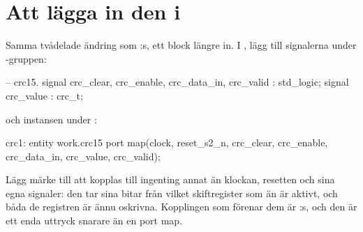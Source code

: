 \section{Att lägga in den i }
\label{c13:sec:wire}

Samma tvådelade ändring som :s, ett block längre in. I
, lägg till signalerna under -gruppen:

\begin{vhdlcode}
    -- crc15.
    signal crc_clear, crc_enable, crc_data_in, crc_valid : std_logic;
    signal crc_value                                     : crc_t;
\end{vhdlcode}

och instansen under :

\begin{vhdlcode}
    crc1: entity work.crc15
        port map(clock, reset_s2_n, crc_clear, crc_enable, crc_data_in, crc_value, crc_valid);
\end{vhdlcode}

Lägg märke till att  kopplas till ingenting annat än klockan, resetten och sina egna
signaler: den tar sina bitar från vilket skiftregister som än är aktivt, och båda de registren är
ännu oskrivna. Kopplingen som förenar dem är :s, och den är ett enda uttryck snarare
än en port map.
